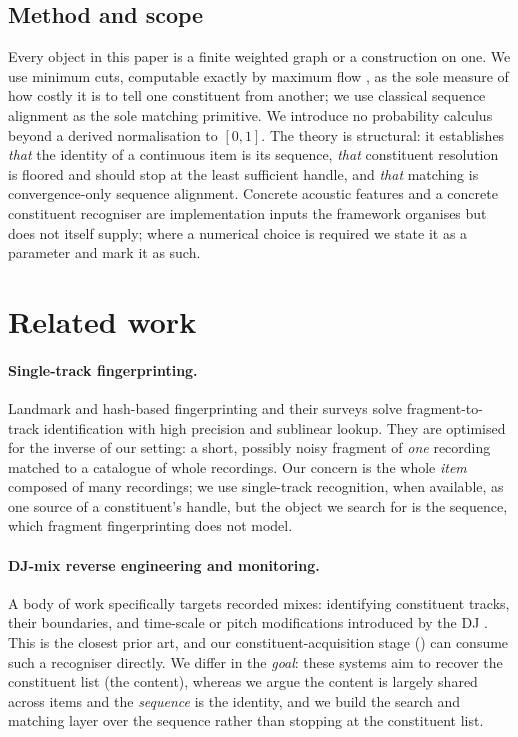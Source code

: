 \documentclass[11pt,twocolumn,a4paper]{article}
\theoremstyle{thmstyle}
\theoremstyle{definition}
\theoremstyle{remark}
\begin{document}
\subsection{Method and scope}

Every object in this paper is a finite weighted graph or a construction on one.
We use minimum cuts, computable exactly by maximum flow
\citep{fordfulkerson1956,menger1927,stoer1997mincut}, as the sole measure of how
costly it is to tell one constituent from another; we use classical sequence
alignment \citep{needleman1970,smith1981} as the sole matching primitive. We
introduce no probability calculus beyond a derived normalisation to $[0,1]$. The
theory is structural: it establishes \emph{that} the identity of a continuous
item is its sequence, \emph{that} constituent resolution is floored and should
stop at the least sufficient handle, and \emph{that} matching is
convergence-only sequence alignment. Concrete acoustic features and a concrete
constituent recogniser are implementation inputs the framework organises but
does not itself supply; where a numerical choice is required we state it as a
parameter and mark it as such.

\section{Related work}
\label{sec:related}

\paragraph{Single-track fingerprinting.}
Landmark and hash-based fingerprinting
\citep{wang2003shazam,haitsma2002fingerprint} and their surveys
\citep{cano2005review,grosche2012review} solve fragment-to-track identification
with high precision and sublinear lookup. They are optimised for the inverse of
our setting: a short, possibly noisy fragment of \emph{one} recording matched to
a catalogue of whole recordings. Our concern is the whole \emph{item} composed
of many recordings; we use single-track recognition, when available, as one
source of a constituent's handle, but the object we search for is the sequence,
which fragment fingerprinting does not model.

\paragraph{DJ-mix reverse engineering and monitoring.}
A body of work specifically targets recorded mixes: identifying constituent
tracks, their boundaries, and time-scale or pitch modifications introduced by
the DJ \citep{sonnleitner2016landmark,six2014panako,schwarz2018dj}. This is the
closest prior art, and our constituent-acquisition stage ()
can consume such a recogniser directly. We differ in the \emph{goal}: these
systems aim to recover the constituent list (the content), whereas we argue the
content is largely shared across items and the \emph{sequence} is the identity,
and we build the search and matching layer over the sequence rather than
stopping at the constituent list.
\end{document}
